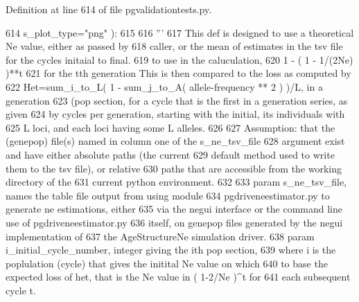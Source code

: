 Definition at line 614 of file pgvalidationtests.\+py.


\begin{DoxyCode}
614                                                             s\_plot\_type=\textcolor{stringliteral}{"png"} ):
615 
616     \textcolor{stringliteral}{'''}
617 \textcolor{stringliteral}{    This def is designed to use a theoretical Ne value, either as passed by}
618 \textcolor{stringliteral}{    caller, or the mean of estimates in the tsv file for the cycles initaial to final.}
619 \textcolor{stringliteral}{    to use in the caluculation,}
620 \textcolor{stringliteral}{            1 - ( 1 - 1/(2Ne) )**t}
621 \textcolor{stringliteral}{    for the tth generation This is then compared to the loss as computed by}
622 \textcolor{stringliteral}{    Het=sum\_i\_to\_L(  1 - sum\_j\_to\_A( allele-frequency ** 2 ) )/L, in a generation}
623 \textcolor{stringliteral}{    (pop section, for a cycle that is the first in a generation series, as given}
624 \textcolor{stringliteral}{    by cycles per generation, starting with the initial, its individuals with}
625 \textcolor{stringliteral}{    L loci, and each loci having some L alleles.}
626 \textcolor{stringliteral}{}
627 \textcolor{stringliteral}{    Assumption:  that the (genepop) file(s) named in column one of the s\_ne\_tsv\_file }
628 \textcolor{stringliteral}{            argument exist and have either absolute paths (the current}
629 \textcolor{stringliteral}{            default method used to write them to the tsv file), or relative}
630 \textcolor{stringliteral}{            paths that are accessible from the working directory of the}
631 \textcolor{stringliteral}{            current python environment.}
632 \textcolor{stringliteral}{}
633 \textcolor{stringliteral}{    param s\_ne\_tsv\_file, names the table file output from using module}
634 \textcolor{stringliteral}{        pgdriveneestimator.py to generate ne estimations, either}
635 \textcolor{stringliteral}{        via the negui interface or the command line use of pgdriveneestimator.py }
636 \textcolor{stringliteral}{        itself, on genepop files generated by the negui implementation of}
637 \textcolor{stringliteral}{        the AgeStructureNe simulation driver.}
638 \textcolor{stringliteral}{    param i\_initial\_cycle\_number, integer giving the ith pop section,}
639 \textcolor{stringliteral}{        where i is the poplulation (cycle) that gives the initital Ne value on which}
640 \textcolor{stringliteral}{        to base the expected loss of het, that is the Ne value in ( 1-2/Ne )^t for}
641 \textcolor{stringliteral}{        each subsequent cycle t.}

\end{DoxyCode}

